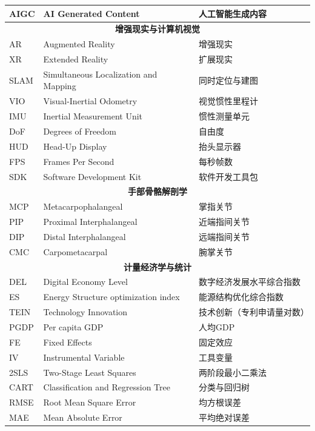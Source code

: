 \begin{center}
\begin{longtable}{m{2.5cm}m{6.5cm}m{5.5cm}}
        AIGC & AI Generated Content & 人工智能生成内容 \\
        \midrule
        \multicolumn{3}{c}{\textbf{增强现实与计算机视觉}} \\
        \midrule
        AR & Augmented Reality & 增强现实 \\
        XR & Extended Reality & 扩展现实 \\
        SLAM & Simultaneous Localization and Mapping & 同时定位与建图 \\
        VIO & Visual-Inertial Odometry & 视觉惯性里程计 \\
        IMU & Inertial Measurement Unit & 惯性测量单元 \\
        DoF & Degrees of Freedom & 自由度 \\
        HUD & Head-Up Display & 抬头显示器 \\
        FPS & Frames Per Second & 每秒帧数 \\
        SDK & Software Development Kit & 软件开发工具包 \\
        \midrule
        \multicolumn{3}{c}{\textbf{手部骨骼解剖学}} \\
        \midrule
        MCP & Metacarpophalangeal & 掌指关节 \\
        PIP & Proximal Interphalangeal & 近端指间关节 \\
        DIP & Distal Interphalangeal & 远端指间关节 \\
        CMC & Carpometacarpal & 腕掌关节 \\
        \midrule
        \multicolumn{3}{c}{\textbf{计量经济学与统计}} \\
        \midrule
        DEL & Digital Economy Level & 数字经济发展水平综合指数 \\
        ES & Energy Structure optimization index & 能源结构优化综合指数 \\
        TEIN & Technology Innovation & 技术创新（专利申请量对数）\\
        PGDP & Per capita GDP & 人均GDP \\
        FE & Fixed Effects & 固定效应 \\
        IV & Instrumental Variable & 工具变量 \\
        2SLS & Two-Stage Least Squares & 两阶段最小二乘法 \\
        CART & Classification and Regression Tree & 分类与回归树 \\
        RMSE & Root Mean Square Error & 均方根误差 \\
        MAE & Mean Absolute Error & 平均绝对误差 \\

\end{longtable}
\end{center}
